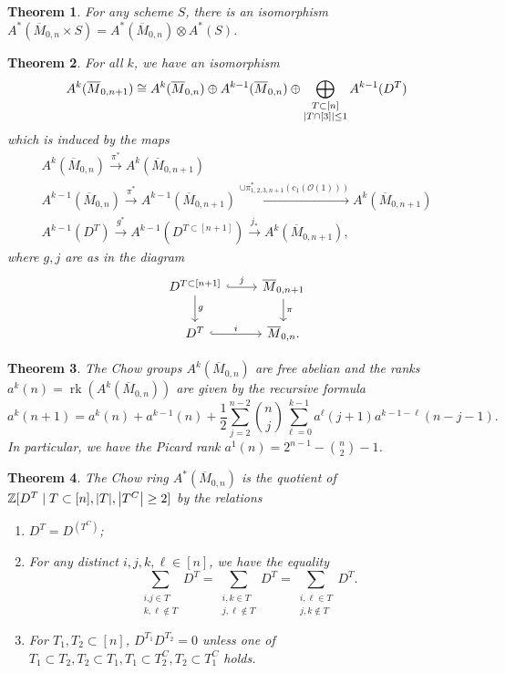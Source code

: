 \documentclass[leqno, openany]{memoir}
\newtheorem{thm}{Theorem}[section]
\theoremstyle{definition}
\theoremstyle{remark}
\theoremstyle{plain}
\theoremstyle{definition}
\theoremstyle{remark}
\newcommand{\Z}{\mathbb{Z}}
\newcommand{\mc}[1]{\mathcal{#1}}
\newcommand{\ol}[1]{\overline{#1}}
\begin{document}
\begin{thm} For any scheme $S$, there is an isomorphism $A^*(\ol{M}_{0,n}
\times S) = A^*(\ol{M}_{0,n}) \otimes A^*(S)$.  \end{thm}

\begin{thm} For all $k$, we have an isomorphism \[ A^k(\ol{M}_{0,n+1}) \cong
A^k(\ol{M}_{0,n}) \oplus A^{k-1}(\ol{M}_{0,n}) \oplus \bigoplus_{\substack{T
\subset [n] \\ \abs{T \cap [3]} \leq 1}} A^{k-1}(D^T) \] which is induced by
the maps \begin{align*} A^k(\ol{M}_{0,n}) \xrightarrow{\pi^*}
    A^k(\ol{M}_{0,n+1}) \\ A^{k-1}(\ol{M}_{0,n}) \xrightarrow{\pi^*}
    A^{k-1}(\ol{M}_{0,n+1}) \xrightarrow{\cup \pi_{1,2,3,n+1}^*
    (c_1(\mc{O}(1)))} A^k(\ol{M}_{0,n+1}) \\ A^{k-1}(D^T) \xrightarrow{g^*}
    A^{k-1}(D^{T \subset [n+1]}) \xrightarrow{j_*} A^k(\ol{M}_{0,n+1}),
    \end{align*} where $g,j$ are as in the diagram \begin{equation*}
    \begin{tikzcd} D^{T \subset [n+1]} \ar{d}{g} \ar[hookrightarrow]{r}{j} &
        \ol{M}_{0,n+1} \ar{d}{\pi} \\ D^T \ar[hookrightarrow]{r}{i} &
    \ol{M}_{0,n}.  \end{tikzcd} \end{equation*} \end{thm}

\begin{thm} The Chow groups $A^k(\ol{M}_{0,n})$ are free abelian and the ranks
    $a^k(n) = \operatorname{rk}(A^k(\ol{M}_{0,n}))$ are given by the recursive
    formula \[ a^k(n+1) = a^k(n) + a^{k-1}(n) + \frac{1}{2} \sum_{j=2}^{n-2}
    \binom{n}{j} \sum_{\ell=0}^{k-1} a^{\ell}(j+1) a^{k-1-\ell}( n-j-1 ). \] In
particular, we have the Picard rank $a^1(n) = 2^{n-1} - \binom{n}{2} - 1$.
\end{thm}

\begin{thm} The Chow ring $A^*(\ol{M}_{0,n})$ is the quotient of $\Z[D^T \mid T
    \subset [n], \abs{T}, \abs{T^C} \geq 2]$ by the relations \begin{enumerate}
        \item $D^T = D^{(T^C)}$; \item For any distinct $i,j,k,\ell \in [n]$,
            we have the equality \[ \sum_{\substack{i.j\in T \\ k,\ell \notin
            T}} D^T = \sum_{\substack{i,k\in T \\ j,\ell \notin T}} D^T =
        \sum_{\substack{i,\ell \in T \\ j,k \notin T}} D^T. \] \item For $T_1,
        T_2 \subset [n]$, $D^{T_1} D^{T_2} = 0$ unless one of $T_1 \subset T_2,
        T_2 \subset T_1, T_1 \subset T_2^C, T_2 \subset T_1^C$ holds.
\end{enumerate} \end{thm}
\end{document}
